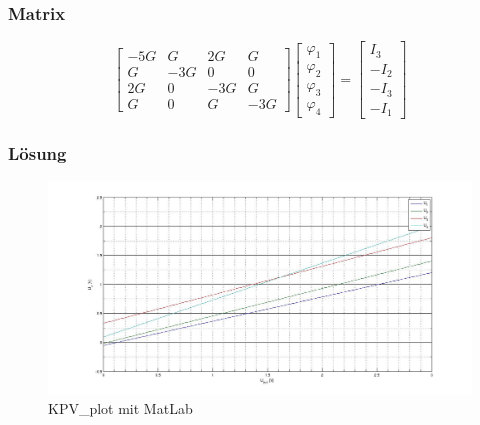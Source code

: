 \documentclass[10pt]{report}
\begin{document}
        \vspace{0.5cm}

        \subsubsection{Matrix}
        \begin{equation*}
            \begin{bmatrix}
                -5G & G & 2G & G\\
                G & -3G & 0 & 0\\
                2G & 0 & -3G & G\\
                G & 0 & G & -3G
            \end{bmatrix}
            \begin{bmatrix}
                \varphi_1 \\
                \varphi_2 \\
                \varphi_3 \\
                \varphi_4
            \end{bmatrix}
            =
            \begin{bmatrix}
                I_3\\
                -I_2\\
                -I_3\\
                -I_1
            \end{bmatrix}
        \end{equation*}

        \subsubsection{Lösung}

        \begin{center}
            \begin{figure}[H]
                \includegraphics[width=\textwidth]{KPV.jpg}
              \caption{KPV\_plot mit MatLab}
            \end{figure}
        \end{center}
\end{document}

